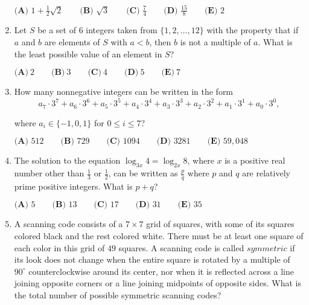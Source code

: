 \documentclass{article}
\begin{document}
\begin{enumerate}[label=\arabic*., itemsep=0.5em]
$\textbf{(A) }   1+\frac12 \sqrt2   \qquad        \textbf{(B) }   \sqrt3   \qquad    \textbf{(C) }   \frac74   \qquad   \textbf{(D) }  \frac{15}{8} \qquad  \textbf{(E) }   2 $\par \vspace{0.5em}\item Let $S$ be a set of $6$ integers taken from $\{1,2,\dots,12\}$ with the property that if $a$ and $b$ are elements of $S$ with $a<b$, then $b$ is not a multiple of $a$. What is the least possible value of an element in $S$?

$\textbf{(A)}\ 2\qquad\textbf{(B)}\ 3\qquad\textbf{(C)}\ 4\qquad\textbf{(D)}\ 5\qquad\textbf{(E)}\ 7$\par \vspace{0.5em}\item How many nonnegative integers can be written in the form 
\begin{equation*}
a_7\cdot3^7+a_6\cdot3^6+a_5\cdot3^5+a_4\cdot3^4+a_3\cdot3^3+a_2\cdot3^2+a_1\cdot3^1+a_0\cdot3^0,
\end{equation*}

where $a_i\in \{-1,0,1\}$ for $0\le i \le 7$?

$\textbf{(A) } 512 \qquad 
\textbf{(B) } 729 \qquad 
\textbf{(C) } 1094 \qquad 
\textbf{(D) } 3281 \qquad 
\textbf{(E) } 59,048 $\par \vspace{0.5em}\item The solution to the equation $\log_{3x} 4 = \log_{2x} 8$, where $x$ is a positive real number other than $\frac{1}{3}$ or $\frac{1}{2}$, can be written as $\frac {p}{q}$ where $p$ and $q$ are relatively prime positive integers. What is $p + q$?

$\textbf{(A) } 5   \qquad    
\textbf{(B) } 13   \qquad    
\textbf{(C) } 17   \qquad   
\textbf{(D) } 31 \qquad  
\textbf{(E) } 35 $\par \vspace{0.5em}\item A scanning code consists of a $7 \times 7$ grid of squares, with some of its squares colored black and the rest colored white. There must be at least one square of each color in this grid of $49$ squares. A scanning code is called $\textit{symmetric}$ if its look does not change when the entire square is rotated by a multiple of $90 ^{\circ}$ counterclockwise around its center, nor when it is reflected across a line joining opposite corners or a line joining midpoints of opposite sides. What is the total number of possible symmetric scanning codes?


\end{enumerate}
\end{document}
